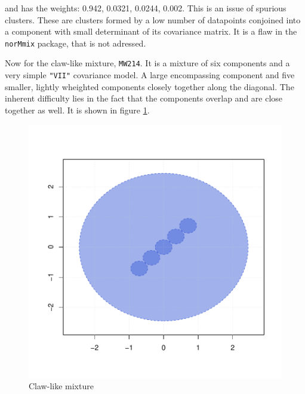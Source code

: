 and has the weights: 0.942, 0.0321, 0.0244, 0.002. This is an issue of 
spurious clusters. These are clusters formed by a low number of datapoints
conjoined into a component with small determinant of its covariance matrix.
It is a flaw in the {\tt norMmix} package, that is not adressed.

Now for the claw-like mixture, {\tt MW214}. It is a mixture of six components
and a very simple {\tt "VII"} covariance model. A large encompassing component
and five smaller, lightly wheighted components closely together along the 
diagonal. The inherent difficulty lies in the fact that the components overlap
and are close together as well. It is shown in figure \ref{fig:MW214}.

\begin{figure}[h!]
    \begin{Rgraph}[0.9]
\includegraphics{chapter3-figMW214}
    \caption{Claw-like mixture}
    \label{fig:MW214}
    \end{Rgraph}
\end{figure}



